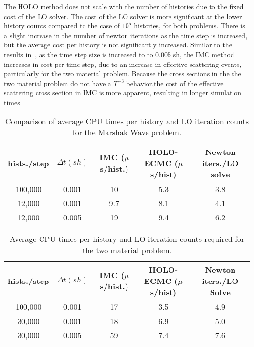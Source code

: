 The HOLO method does not scale with the number of
histories due to the fixed cost of the LO solver.  The cost of the LO solver is more
significant at the lower history counts compared to the case of $10^5$
histories, for both problems. 
There is a slight increase in the number of
newton iterations as the time step is increased, but the average cost per history is
not significantly increased.   Similar to the results
in~\cite{park}, as the time step size is increased to to 0.005 sh, the IMC method
increases in cost per time step, due to an increase in effective scattering events, particularly for the two material problem. Because
the cross sections in the the two material problem do not have a $T^{-3}$
behavior,the cost of the effective scattering cross section in IMC is more apparent,
resulting in longer simulation times. 
\begin{table}[H]
\centering
\caption{\label{marshak_table} {Comparison of average CPU times per history
    and LO iteration counts for the Marshak Wave problem. }}
\vspace{-0.1in}
	\begin{tabular}{|cc|c|cc|}\hline
hists./step & $\Delta t (sh)$ & IMC ($\mu$s/hist.) & HOLO-ECMC ($\mu$s/hist) & Newton
iters./LO solve \\ \hline
100,000                    &   0.001	& 10  &  5.3   & 3.8               \\
12,000           &   0.001	& 9.7 &	 8.1   & 4.1               \\
12,000          &   0.005	& 19  &  9.4   & 6.2                \\ \hline
\end{tabular}
\end{table}

\begin{table}[htb!]
\centering
\caption{\label{twomat_table} {Average CPU times per history and LO iteration
counts required for the two material problem.}}
	\begin{tabular}{|cc|c|cc|} \hline
hists./step & $\Delta t (sh)$ & IMC ($\mu$s/hist.) & HOLO-ECMC ($\mu$s/hist)  &
Newton iters./LO Solve\\ \hline
100,000          &   0.001	& 17  &	3.5   & 4.9 \\
30,000   &    0.001	& 18  &	6.9   &    5.0 \\
30,000    &   0.005	& 59  & 7.4   &    7.6 \\ \hline
\end{tabular}
\end{table}

